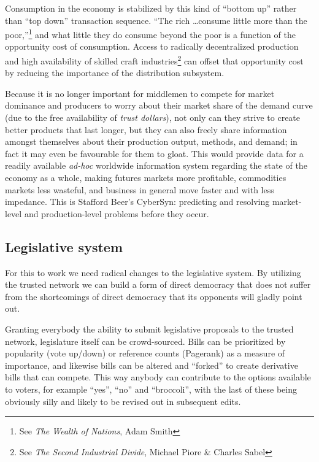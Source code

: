 Consumption in the economy is stabilized by this kind of ``bottom up'' rather
than ``top down'' transaction sequence. ``The rich \ldots consume little more
than the poor,''\footnote{See \textit{The Wealth of Nations}, Adam Smith} and
what little they do consume beyond the poor is a function of the opportunity
cost of consumption. Access to radically decentralized production and high
availability of skilled craft industries\footnote{See \textit{The Second
Industrial Divide}, Michael Piore \& Charles Sabel} can of\hbox{}fset that
opportunity cost by reducing the importance of the distribution subsystem.

Because it is no longer important for middlemen to compete for market dominance
and producers to worry about their market share of the demand curve (due to the
free availability of \textit{trust dollars}), not only can they strive to 
create better products that last longer, but they can also freely share
information amongst themselves about their production output, methods, and
demand; in fact it may even be favourable for them to gloat. This would provide
data for a readily available \textit{ad-hoc} worldwide information system
regarding the state of the economy as a whole, making futures markets more
prof\hbox{}itable, commodities markets less wasteful, and business in general
move faster and with less impedance. This is Staf\hbox{}ford Beer's CyberSyn:
predicting and resolving market-level and production-level problems before they
occur.


\subsection{Legislative system}
\label{s:artificial_scarcity:five_steps:legislative_system}

For this to work we need radical changes to the legislative system. By 
utilizing the trusted network we can build a form of direct democracy that does
not suf\hbox{}fer from the shortcomings of direct democracy that its opponents
will gladly point out. 

Granting everybody the ability to submit legislative proposals to the trusted
network, legislature itself can be crowd-sourced. Bills can be prioritized by
popularity (vote up/down) or reference counts (Pagerank) as a measure of
importance, and likewise bills can be altered and ``forked'' to create
derivative bills that can compete. This way anybody can contribute to the
options available to voters, for example ``yes'', ``no'' and ``broccoli'', with
the last of these being obviously silly and likely to be revised out in
subsequent edits.

